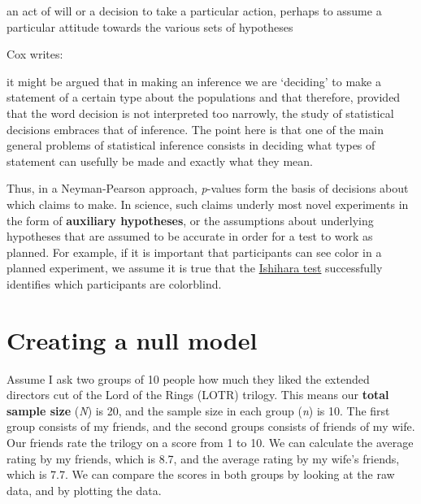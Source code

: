 \documentclass[
  oneside]{krantz}
\renewenvironment{quote}{\begin{VF}}{\end{VF}}
\begin{document}
\begin{quote}
an act of will or a decision to take a particular action, perhaps to assume a particular attitude towards the various sets of hypotheses
\end{quote}

Cox \citeyearpar{cox_problems_1958} writes:

\begin{quote}
it might be argued that in making an inference we are `deciding' to make a statement of a certain type about the populations and that therefore, provided that the word decision is not interpreted too narrowly, the study of statistical decisions embraces that of inference. The point here is that one of the main general problems of statistical inference consists in deciding what types of statement can usefully be made and exactly what they mean.
\end{quote}

Thus, in a Neyman-Pearson approach, \emph{p}-values form the basis of decisions about which claims to make. In science, such claims underly most novel experiments in the form of \textbf{auxiliary hypotheses}, or the assumptions about underlying hypotheses that are assumed to be accurate in order for a test to work as planned. For example, if it is important that participants can see color in a planned experiment, we assume it is true that the \href{https://en.wikipedia.org/wiki/Ishihara_test}{Ishihara test} successfully identifies which participants are colorblind.

\hypertarget{creating-a-null-model}{%
\section{Creating a null model}\label{creating-a-null-model}}

Assume I ask two groups of 10 people how much they liked the extended directors cut of the Lord of the Rings (LOTR) trilogy. This means our \textbf{total sample size} (\emph{N}) is 20, and the sample size in each group (\emph{n}) is 10. The first group consists of my friends, and the second groups consists of friends of my wife. Our friends rate the trilogy on a score from 1 to 10. We can calculate the average rating by my friends, which is 8.7, and the average rating by my wife's friends, which is 7.7. We can compare the scores in both groups by looking at the raw data, and by plotting the data.
\end{document}
